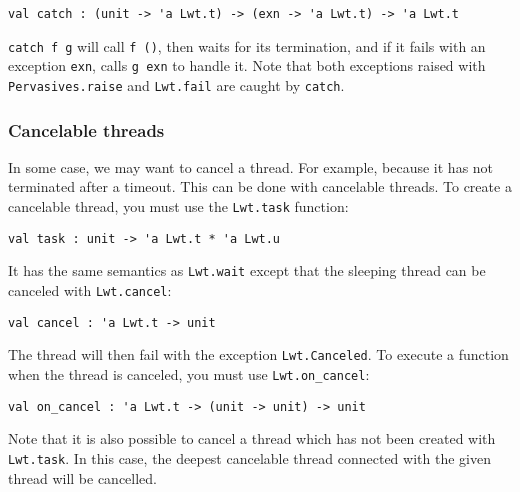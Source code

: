 \lstset{language=[Objective]Caml}\begin{lstlisting}
val catch : (unit -> 'a Lwt.t) -> (exn -> 'a Lwt.t) -> 'a Lwt.t
\end{lstlisting}
\medskip

\noindent
{\tt catch f g} will call {\tt f ()}, then waits for its
termination, and if it fails with an exception {\tt exn}, calls
{\tt g exn} to handle it. Note that both exceptions raised with
{\tt Pervasives.raise} and {\tt Lwt.fail} are caught by
{\tt catch}.



\subsubsection{ Cancelable threads }

In some case, we may want to cancel a thread. For example, because it
has not terminated after a timeout. This can be done with cancelable
threads. To create a cancelable thread, you must use the
{\tt Lwt.task} function:



\lstset{language=[Objective]Caml}\begin{lstlisting}
val task : unit -> 'a Lwt.t * 'a Lwt.u
\end{lstlisting}
\medskip

\noindent
It has the same semantics as {\tt Lwt.wait} except that the
sleeping thread can be canceled with {\tt Lwt.cancel}:



\lstset{language=[Objective]Caml}\begin{lstlisting}
val cancel : 'a Lwt.t -> unit
\end{lstlisting}
\medskip

\noindent
The thread will then fail with the exception
{\tt Lwt.Canceled}. To execute a function when the thread is
canceled, you must use {\tt Lwt.on\_cancel}:



\lstset{language=[Objective]Caml}\begin{lstlisting}
val on_cancel : 'a Lwt.t -> (unit -> unit) -> unit
\end{lstlisting}
\medskip

\noindent
Note that it is also possible to cancel a thread which has not been
created with {\tt Lwt.task}. In this case, the deepest cancelable
thread connected with the given thread will be cancelled.




